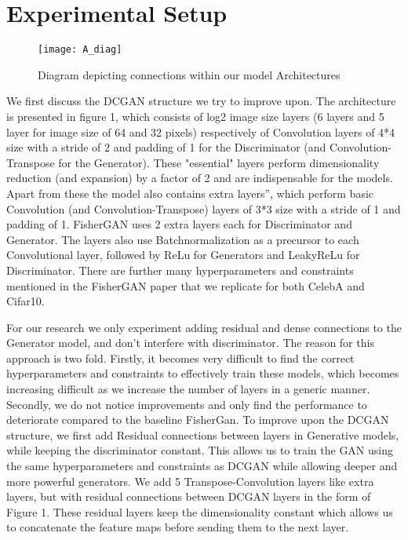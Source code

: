 \documentclass{article}
\begin{document}
\section{Experimental Setup}
\label{sec:ES}

\begin{figure}[h]
\caption{Diagram depicting connections within our model Architectures }
\texttt{[image: A\_diag]}
\end{figure}

We first discuss the DCGAN structure we try to improve upon. The architecture is presented in figure 1, which consists of log2 image size layers (6 layers and 5 layer for image size of 64 and 32 pixels) respectively of Convolution layers of 4*4 size with a stride of 2 and padding of 1 for the Discriminator (and Convolution-Transpose for the Generator). These "essential" layers perform dimensionality reduction (and expansion) by a factor of 2 and are indispensable for the models. Apart from these the model also contains extra layers”, which perform basic Convolution (and Convolution-Transpose) layers of 3*3 size with a stride of 1 and padding of 1. FisherGAN uses 2 extra layers each for Discriminator and Generator. The layers also use Batchnormalization as a precursor to each Convolutional layer, followed by ReLu for Generators and LeakyReLu for Discriminator. There are further many hyperparameters and constraints mentioned in the FisherGAN paper that we replicate for both CelebA and Cifar10.

For our research we only experiment adding residual and dense connections to the Generator model, and don’t interfere with discriminator. The reason for this approach is two fold. Firstly, it becomes very difficult to find the correct hyperparameters and constraints to effectively train these models, which becomes increasing difficult as we increase the number of layers in a generic manner. Secondly, we do not notice improvements and only find the performance to deteriorate compared to the baseline FisherGan. To improve upon the DCGAN structure, we first add Residual connections between layers in Generative models, while keeping the discriminator constant. This allows us to train the GAN using the same hyperparameters and constraints as DCGAN while allowing deeper and more powerful generators. We add 5 Transpose-Convolution layers like extra layers, but with residual connections between DCGAN layers in the form of Figure 1. These residual layers keep the dimensionality constant which allows us to concatenate the feature maps before sending them to the next layer.
\end{document}
